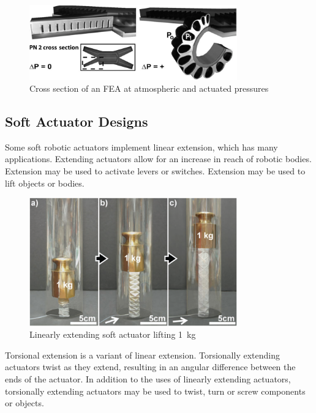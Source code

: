 \begin{figure}[H]
	\centering
	\includegraphics[width=0.8\textwidth]{FEA.png}
	\caption[Cross section of an FEA]{Cross section of an FEA at atmospheric and actuated pressures \citep{Shepherd2011}}
	\label{fig:fea}
\end{figure}

\subsection{Soft Actuator Designs}

Some soft robotic actuators implement linear extension, which has many applications. Extending actuators allow for an increase in reach of robotic bodies. Extension may be used to activate levers or switches. Extension may be used to lift objects or bodies. \citep{Martinez2012}

\begin{figure}[H]
	\centering
	\includegraphics[width=0.8\textwidth]{LinearExtension.png}
	\caption[Linearly extending soft actuator]{Linearly extending soft actuator lifting \SI{1}{kg} \citep{Martinez2012}}
	\label{fig:lea}
\end{figure}

Torsional extension is a variant of linear extension. Torsionally extending actuators twist as they extend, resulting in an angular difference between the ends of the actuator. In addition to the uses of linearly extending actuators, torsionally extending actuators may be used to twist, turn or screw components or objects. \citep{Yan2018}

